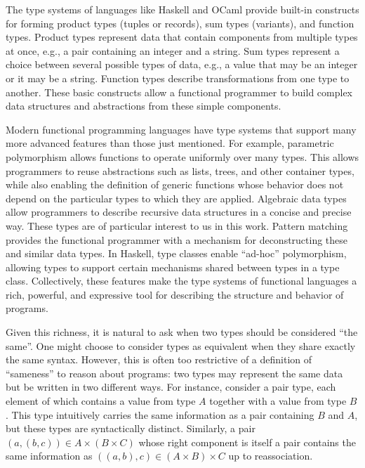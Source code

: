 \documentclass{msthesis}
\theoremstyle{definition}
\begin{document}
The type systems of languages like Haskell and OCaml provide built-in constructs for forming product types (tuples or records), sum types (variants), and function types.  Product types represent data that contain components from multiple types at once, e.g., a pair containing an integer and a string.  Sum types represent a choice between several possible types of data, e.g., a value that may be an integer or it may be a string.  Function types describe transformations from one type to another.  These basic constructs allow a functional programmer to build complex data structures and abstractions from these simple components.

Modern functional programming languages have type systems that support many more advanced features than those just mentioned.  For example, parametric polymorphism allows functions to operate uniformly over many types. This allows programmers to reuse abstractions such as lists, trees, and other container types, while also enabling the definition of generic functions whose behavior does not depend on the particular types to which they are applied.  Algebraic data types allow programmers to describe recursive data structures in a concise and precise way.  These types are of particular interest to us in this work.  Pattern matching provides the functional programmer with a mechanism for deconstructing these and similar data types.  In Haskell, type classes enable ``ad-hoc'' polymorphism, allowing types to support certain mechanisms shared between types in a type class.  Collectively, these features make the type systems of functional languages a rich, powerful, and expressive tool for describing the structure and behavior of programs.

Given this richness, it is natural to ask when two types should be considered ``the same''.  One might choose to consider types as equivalent when they share exactly the same syntax.  However, this is often too restrictive of a definition of ``sameness'' to reason about programs: two types may represent the same data but be written in two different ways.  For instance, consider a pair type, each element of which contains a value from type $A$ together with a value from type $B$.  This type intuitively carries the same information as a pair containing $B$ and $A$, but these types are syntactically distinct.  Similarly, a pair $(a, (b, c)) \in A \times (B \times C)$ whose right component is itself a pair contains the same information as $((a, b), c) \in (A \times B) \times C$ up to reassociation.
\end{document}
